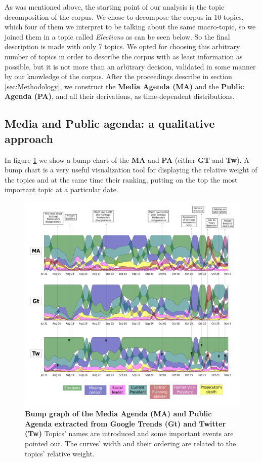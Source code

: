 
\par As was mentioned above, the starting point of our analysis is the topic decomposition of the corpus.
We chose to decompose the corpus in 10 topics, which four of them we interpret to be talking about the same macro-topic, so we joined them in a topic called \emph{Elections} as can be seen below. So the final description is made with only 7 topics.
We opted for choosing this arbitrary number of topics in order to describe the corpus with as least information as possible, but it is not more than an arbitrary decision, validated in some manner by our knowledge of the corpus.
After the proceedings describe in section \ref{sec:Methodology}, we construct the \textbf{Media Agenda (MA)} and the \textbf{Public Agenda (PA)}, and all their derivations, as time-dependent distributions. 

\subsection{Media and Public agenda: a qualitative approach}

\par In figure \ref{fig:all_agenda} we show a bump chart of the \textbf{MA} and \textbf{PA} (either \textbf{GT} and \textbf{Tw}). A bump chart is a very useful visualization tool for displaying the relative weight of the topics and at the same time their ranking, putting on the top the most important topic at a particular date.

\begin{figure}[h]
\includegraphics[width = \textwidth]{images/Fig1.pdf}
\caption{\textbf{Bump graph of the Media Agenda (MA) and Public Agenda extracted from Google Trends (Gt) and Twitter (Tw)} Topics’ names are introduced and some important events are pointed out. The curves’ width and their ordering are related to the topics’ relative weight.}
\label{fig:all_agenda}
\end{figure}
 

